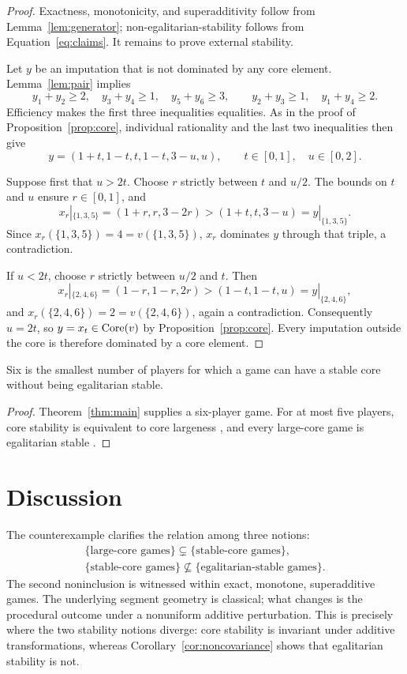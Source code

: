 \begin{proof}
Exactness, monotonicity, and superadditivity follow from
Lemma~\ref{lem:generator}; non-egalitarian-stability follows from
Equation~\eqref{eq:claims}. It remains to prove external stability.

Let $y$ be an imputation that is not dominated by any core element.
Lemma~\ref{lem:pair} implies
\[
 y_1+y_2\ge2,\quad
 y_3+y_4\ge1,\quad
 y_5+y_6\ge3,
\qquad
 y_2+y_3\ge1,\quad
 y_1+y_4\ge2.
\]
Efficiency makes the first three inequalities equalities. As in the proof of
Proposition~\ref{prop:core}, individual rationality and the last two
inequalities then give
\[
 y=(1+t,1-t,t,1-t,3-u,u),
 \qquad t\in[0,1],\quad u\in[0,2].
\]

Suppose first that $u>2t$. Choose $r$ strictly between $t$ and $u/2$.
The bounds on $t$ and $u$ ensure $r\in[0,1]$, and
\[
 x_r|_{\{1,3,5\}}=(1+r,r,3-2r)
   >(1+t,t,3-u)=y|_{\{1,3,5\}}.
\]
Since $x_r(\{1,3,5\})=4=v(\{1,3,5\})$, $x_r$ dominates $y$ through that
triple, a contradiction.

If $u<2t$, choose $r$ strictly between $u/2$ and $t$. Then
\[
 x_r|_{\{2,4,6\}}=(1-r,1-r,2r)
   >(1-t,1-t,u)=y|_{\{2,4,6\}},
\]
and $x_r(\{2,4,6\})=2=v(\{2,4,6\})$, again a contradiction. Consequently
$u=2t$, so $y=x_t\in\operatorname{Core}(v)$ by Proposition~\ref{prop:core}. Every
imputation outside the core is therefore dominated by a core element.
\end{proof}

\begin{corollary}[sharpness]\label{cor:sharp}
Six is the smallest number of players for which a game can have a stable core
without being egalitarian stable.
\end{corollary}

\begin{proof}
Theorem~\ref{thm:main} supplies a six-player game. For at most five players,
core stability is equivalent to core largeness \citep{Estevez2012}, and every
large-core game is egalitarian stable \citep{Dietzenbacher2021}.
\end{proof}

\section{Discussion}\label{sec:discussion}

The counterexample clarifies the relation among three notions:
\[
\begin{gathered}
 \{\text{large-core games}\}\subsetneq
 \{\text{stable-core games}\},\\
 \{\text{stable-core games}\}\not\subseteq
 \{\text{egalitarian-stable games}\}.
\end{gathered}
\]
The second noninclusion is witnessed within exact, monotone, superadditive
games. The underlying segment geometry is classical; what changes is the
procedural outcome under a nonuniform additive perturbation. This is precisely
where the two stability notions diverge: core stability is invariant under
additive transformations, whereas Corollary~\ref{cor:noncovariance} shows that
egalitarian stability is not.

